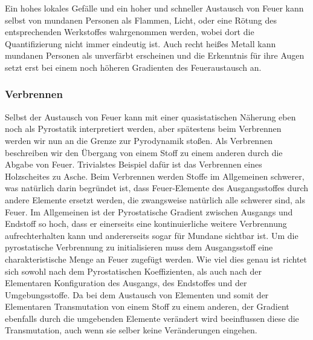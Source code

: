 \documentclass[a5paper,8pt]{book}
\begin{document}


Ein hohes lokales Gefälle und ein hoher und schneller Austausch von Feuer kann selbst von mundanen Personen als Flammen, 
Licht, oder eine Rötung des entsprechenden Werkstoffes wahrgenommen werden, wobei dort die Quantifizierung nicht immer 
eindeutig ist. Auch recht heißes Metall kann mundanen Personen als unverfärbt erscheinen und die Erkenntnis für ihre Augen 
setzt erst bei einem noch höheren Gradienten des Feueraustausch an.


\subsubsection{Verbrennen}

Selbst der Austausch von Feuer kann mit einer quasistatischen Näherung eben noch als Pyrostatik interpretiert werden, aber 
spätestens beim Verbrennen werden wir nun an die Grenze zur Pyrodynamik stoßen.
Als Verbrennen beschreiben wir den Übergang von einem Stoff zu einem anderen durch die Abgabe von Feuer. Trivialstes 
Beispiel dafür ist das Verbrennen eines Holzscheites zu Asche.
Beim Verbrennen werden Stoffe im Allgemeinen schwerer, was natürlich darin begründet ist, dass Feuer-Elemente des 
Ausgangsstoffes durch andere Elemente ersetzt werden, die zwangsweise natürlich alle schwerer sind, als Feuer.
Im Allgemeinen ist der Pyrostatische Gradient zwischen Ausgangs und Endstoff so hoch, dass er einerseits eine 
kontinuierliche weitere Verbrennung aufrechterhalten kann und andererseits sogar für Mundane sichtbar ist.
Um die pyrostatische Verbrennung zu initialisieren muss dem Ausgangsstoff eine charakteristische Menge an Feuer zugefügt 
werden. Wie viel dies genau ist richtet sich sowohl nach dem Pyrostatischen Koeffizienten, als auch nach der Elementaren 
Konfiguration des Ausgangs, des Endstoffes und der Umgebungsstoffe. Da bei dem Austausch von Elementen und somit der 
Elementaren Transmutation von einem Stoff zu einem anderen, der Gradient ebenfalls durch die umgebenden Elemente verändert
wird beeinflussen diese die Transmutation, auch wenn sie selber keine Veränderungen eingehen.\\
\end{document}
